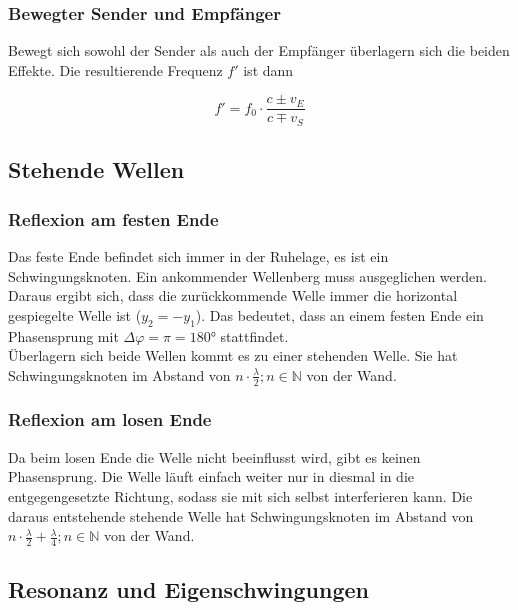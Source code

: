 \documentclass[a4paper]{article}
\begin{document}
			\subsubsection{Bewegter Sender und Empfänger}
				Bewegt sich sowohl der Sender als auch der Empfänger überlagern sich die beiden Effekte. Die resultierende Frequenz $f'$ ist dann
				
				\begin{equation}
					f' = f_0\cdot\frac{c \pm v_E}{c \mp v_S}
				\end{equation}
			
		
		\subsection{Stehende Wellen}
		
			\subsubsection{Reflexion am festen Ende}
				Das feste Ende befindet sich immer in der Ruhelage, es ist ein Schwingungsknoten. Ein ankommender Wellenberg muss ausgeglichen werden. Daraus ergibt sich, dass die zurückkommende Welle immer die horizontal gespiegelte Welle ist ($y_2 = -y_1$). Das bedeutet, dass an einem festen Ende ein Phasensprung mit $\Delta\varphi=\pi=180\si{\degree}$ stattfindet.\\
				Überlagern sich beide Wellen kommt es zu einer stehenden Welle. Sie hat Schwingungsknoten im Abstand von $n\cdot \frac{\lambda}{2}; n\in\mathbb{N}$ von der Wand.
			
			\subsubsection{Reflexion am losen Ende}
			    Da beim losen Ende die Welle nicht beeinflusst wird, gibt es keinen Phasensprung. Die Welle läuft einfach weiter nur in diesmal in die entgegengesetzte Richtung, sodass sie mit sich selbst interferieren kann. Die daraus entstehende stehende Welle hat Schwingungsknoten im Abstand von $n\cdot \frac{\lambda}{2} + \frac{\lambda}{4}; n\in\mathbb{N}$ von der Wand.
			
				
		
		\subsection{Resonanz und Eigenschwingungen}%
	
\end{document}
